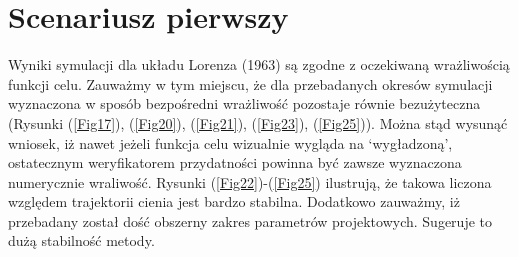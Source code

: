\documentclass[12pt, twoside]{book}
\begin{document}
\section{Scenariusz pierwszy}
Wyniki symulacji dla układu Lorenza (1963) są zgodne z oczekiwaną wrażliwością funkcji celu. Zauważmy w tym miejscu, że dla przebadanych okresów symulacji wyznaczona w sposób bezpośredni wrażliwość pozostaje równie bezużyteczna (Rysunki (\ref{Fig17}), (\ref{Fig20}), (\ref{Fig21}), (\ref{Fig23}), (\ref{Fig25})). Można stąd wysunąć wniosek, iż nawet jeżeli funkcja celu wizualnie wygląda na ‘wygładzoną’, ostatecznym weryfikatorem przydatności powinna być zawsze wyznaczona numerycznie wraliwość. \newline
Rysunki (\ref{Fig22})-(\ref{Fig25}) ilustrują, że takowa liczona względem trajektorii cienia jest bardzo stabilna. Dodatkowo zauważmy, iż przebadany został dość obszerny zakres parametrów projektowych. Sugeruje to dużą stabilność metody. 
\end{document}

